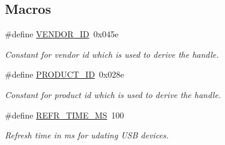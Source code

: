 \subsection*{Macros}
\begin{DoxyCompactItemize}
\item 
\hypertarget{group__xbcdeamon_ga5e2fdecfea0fad3bdb8fa4eedf041a3d}{\#define \hyperlink{group__xbcdeamon_ga5e2fdecfea0fad3bdb8fa4eedf041a3d}{V\-E\-N\-D\-O\-R\-\_\-\-I\-D}~0x045e}\label{group__xbcdeamon_ga5e2fdecfea0fad3bdb8fa4eedf041a3d}

\begin{DoxyCompactList}\small\item\em Constant for vendor id which is used to derive the handle. \end{DoxyCompactList}\item 
\hypertarget{group__xbcdeamon_ga6b41096e44c646df97fba9581acb4b4a}{\#define \hyperlink{group__xbcdeamon_ga6b41096e44c646df97fba9581acb4b4a}{P\-R\-O\-D\-U\-C\-T\-\_\-\-I\-D}~0x028e}\label{group__xbcdeamon_ga6b41096e44c646df97fba9581acb4b4a}

\begin{DoxyCompactList}\small\item\em Constant for product id which is used to derive the handle. \end{DoxyCompactList}\item 
\hypertarget{group__xbcdeamon_gad1232c2aba214d204c53376b7488c8fb}{\#define \hyperlink{group__xbcdeamon_gad1232c2aba214d204c53376b7488c8fb}{R\-E\-F\-R\-\_\-\-T\-I\-M\-E\-\_\-\-M\-S}~100}\label{group__xbcdeamon_gad1232c2aba214d204c53376b7488c8fb}

\begin{DoxyCompactList}\small\item\em Refresh time in ms for udating U\-S\-B devices. \end{DoxyCompactList}\end{DoxyCompactItemize}
